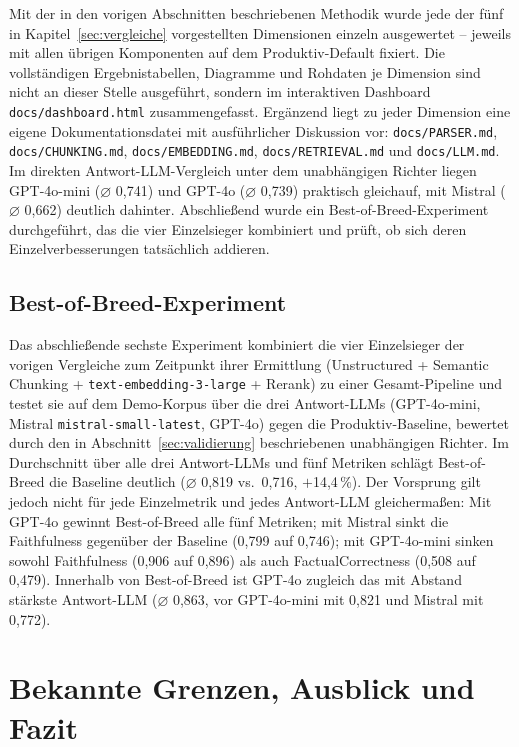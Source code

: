 \documentclass[11pt,a4paper]{article}
\begin{document}
Mit der in den vorigen Abschnitten beschriebenen Methodik wurde jede der
fünf in Kapitel~\ref{sec:vergleiche} vorgestellten Dimensionen einzeln
ausgewertet -- jeweils mit allen übrigen Komponenten auf dem
Produktiv-Default fixiert. Die vollständigen Ergebnistabellen, Diagramme
und Rohdaten je Dimension sind nicht an dieser
Stelle ausgeführt, sondern im interaktiven Dashboard
\texttt{docs/dashboard.html} zusammengefasst. Ergänzend liegt zu jeder Dimension eine
eigene Dokumentationsdatei mit ausführlicher Diskussion vor:
\texttt{docs/PARSER.md}, \texttt{docs/CHUNKING.md},
\texttt{docs/EMBEDDING.md}, \texttt{docs/RETRIEVAL.md} und
\texttt{docs/LLM.md}. Im direkten Antwort-LLM-Vergleich unter dem unabhängigen Richter liegen GPT-4o-mini ($\varnothing$ 0,741) und GPT-4o ($\varnothing$ 0,739) praktisch gleichauf, mit Mistral ($\varnothing$ 0,662) deutlich dahinter. Abschließend wurde ein Best-of-Breed-Experiment durchgeführt, das die vier Einzelsieger kombiniert und prüft, ob sich deren Einzelverbesserungen tatsächlich addieren.

\subsection{Best-of-Breed-Experiment}
\label{sec:best-of-breed}

Das abschließende sechste Experiment kombiniert die vier Einzelsieger der
vorigen Vergleiche zum Zeitpunkt ihrer Ermittlung (Unstructured + Semantic
Chunking + \texttt{text-embedding-3-large} + Rerank) zu einer
Gesamt-Pipeline und testet sie auf dem Demo-Korpus über die drei
Antwort-LLMs (GPT-4o-mini, Mistral \texttt{mistral-small-latest}, GPT-4o) gegen die Produktiv-Baseline,
bewertet durch den in Abschnitt~\ref{sec:validierung} beschriebenen
unabhängigen Richter. Im Durchschnitt über alle drei Antwort-LLMs und
fünf Metriken schlägt Best-of-Breed die Baseline deutlich ($\varnothing$
0,819 vs.\ 0,716, $+$14,4\,\%). Der Vorsprung gilt jedoch nicht für jede
Einzelmetrik und jedes Antwort-LLM gleichermaßen: Mit GPT-4o gewinnt
Best-of-Breed alle fünf Metriken; mit Mistral sinkt die Faithfulness
gegenüber der Baseline (0,799 auf 0,746); mit GPT-4o-mini sinken sowohl
Faithfulness (0,906 auf 0,896) als auch FactualCorrectness (0,508 auf
0,479). Innerhalb von Best-of-Breed ist GPT-4o zugleich das mit Abstand
stärkste Antwort-LLM ($\varnothing$ 0,863, vor GPT-4o-mini mit 0,821 und
Mistral mit 0,772).

\section{Bekannte Grenzen, Ausblick und Fazit}
\label{sec:grenzen}
\end{document}

